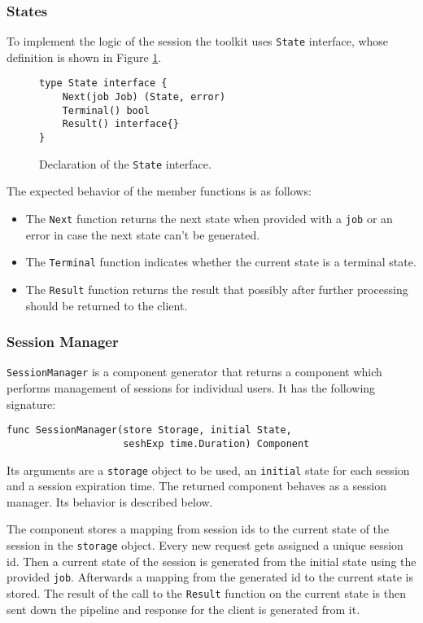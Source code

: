 \subsubsection{States}
\label{sec:state}
To implement the logic of the session the toolkit uses \texttt{State}
interface, whose definition is shown in Figure \ref{fig:State}.
\begin{figure}[h]
\centering
\begin{lstlisting}
type State interface {
    Next(job Job) (State, error)
    Terminal() bool
    Result() interface{}
}
\end{lstlisting}
\caption[scale=1.0]{Declaration of the \texttt{State} interface.}
\label{fig:State}
\end{figure}
The expected behavior of the member functions is as follows:
\begin{itemize}
	\item The \texttt{Next} function returns the next state when provided 
          with a \texttt{job} or an error in case the next state can't be 
          generated.
	\item The \texttt{Terminal} function indicates whether the current 
          state is a terminal state.
	\item The \texttt{Result} function returns the result that possibly 
          after further processing should be returned to the client.
\end{itemize}

\subsubsection{Session Manager}
\texttt{SessionManager} is a component generator that returns a component
which performs management of sessions for individual users. It has the following signature:
\begin{lstlisting}
func SessionManager(store Storage, initial State, 
                    seshExp time.Duration) Component
\end{lstlisting}
Its arguments are a \texttt{storage} object to be used, an \texttt{initial} 
state for each session and a session expiration time.
The returned component behaves as a session manager. 
Its behavior is described below.

The component stores a mapping from session ids to the current state of the session
in the \texttt{storage} object.
Every new request gets assigned a unique session id. Then a current state
of the session is generated from the initial state using the provided
\texttt{job}. Afterwards a mapping from the generated id to the current state
is stored. The result of the call to the \texttt{Result} function on the
current state is then sent down the pipeline and response for the client 
is generated from it.

